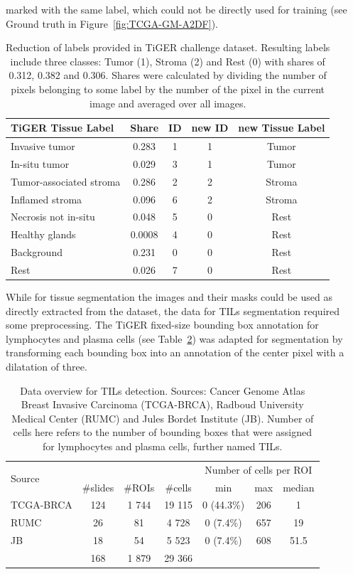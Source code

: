 marked with the same label, which could not be directly used for training (see Ground truth in Figure~\ref*{fig:TCGA-GM-A2DF}).
\begin{table}[h!]
\centering
\begin{tabular}{ l c c c c } 
\hline
TiGER Tissue Label & Share & ID & new ID & new Tissue Label \\ 
\hline
Invasive tumor & 0.283 & 1 & 1 & Tumor\\ 
In-situ tumor & 0.029 & 3 & 1 & Tumor\\ 
Tumor-associated stroma & 0.286 & 2 & 2 & Stroma\\
Inflamed stroma & 0.096 & 6 & 2 & Stroma\\
Necrosis not in-situ & 0.048 & 5 & 0 & Rest\\
Healthy glands & 0.0008 & 4 & 0 & Rest\\ 
Background & 0.231 & 0 & 0 & Rest\\ 
Rest & 0.026 & 7 & 0 & Rest\\
\hline
\end{tabular}
\caption{\label{tab:label_data} Reduction of labels provided in TiGER challenge dataset. Resulting labels include three classes: Tumor (1), Stroma (2) and Rest (0) with shares of 0.312, 0.382 and 0.306. Shares were calculated by dividing
the number of pixels belonging to some label by the number of the pixel in the current image and averaged over all images. }
\end{table}

While for tissue segmentation the images and their masks could be used as directly extracted from the dataset, the data for TILs segmentation required some preprocessing. The TiGER fixed-size bounding box annotation for lymphocytes and plasma cells (see Table~\ref{tab:tils_data}) was adapted for segmentation by transforming each bounding box into an annotation of the center pixel with a dilatation of three.
\begin{table}[h!]
\centering
\begin{tabular}{ l c c c c c c } 
\hline
\multirow{2}{*}{Source} & & & & \multicolumn{3}{c}{Number of cells per ROI}\\ 
\cline{2-7}
 & \#slides & \#ROIs & \#cells & min & max & median \\ 
\hline
TCGA-BRCA & 124 & 1 744 & 19 115 & 0 (44.3\%) & 206 & 1\\ 
RUMC & 26 & 81 & 4 728 & 0 (7.4\%) & 657 & 19\\ 
JB & 18 & 54 & 5 523 & 0 (7.4\%) & 608 & 51.5\\
\hline
 & 168 & 1 879 & 29 366 & & &\\
\end{tabular}
\caption{\label{tab:tils_data} Data overview for TILs detection. Sources: Cancer Genome Atlas Breast Invasive Carcinoma (TCGA-BRCA),
Radboud University Medical Center (RUMC) and Jules Bordet Institute (JB). Number of cells here refers to the number of
bounding boxes that were assigned for lymphocytes and plasma cells, further named TILs.}
\end{table}

